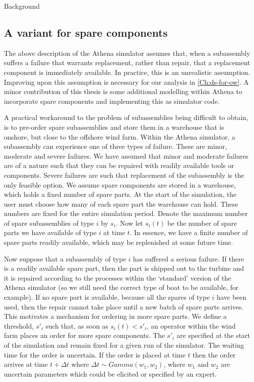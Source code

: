 \begin{chapter}{Background \label{Ch:background}}
\subsection{A variant for spare components \label{Sec:athena-variant}}

The above description of the Athena simulator assumes that, when a subassembly suffers a failure that warrants replacement, rather than repair, that a replacement component is immediately available. In practice, this is an unrealistic assumption. Improving upon this assumption is necessary for our analysis in \cref{Ch:ds-for-ow}. A minor contribution of this thesis is some additional modelling within Athena to incorporate spare components and implementing this as simulator code.

A practical workaround to the problem of subassemblies being difficult to obtain, is to pre-order spare subassemblies and store them in a warehouse that is onshore, but close to the offshore wind farm. Within the Athena simulator, a subassembly can experience one of three types of failure. These are minor, moderate and severe failures. We have assumed that minor and moderate failures are of a nature such that they can be repaired with readily available tools or components. Severe failures are such that replacement of the subassembly is the only feasible option. We assume spare components are stored in a warehouse, which holds a fixed number of spare parts. At the start of the simulation, the user must choose how many of each spare part the warehouse can hold. These numbers are fixed for the entire simulation period. Denote the maximum number of spare subassemblies of type $i$ by $s_i$. Now let $s_i(t)$ be the number of spare parts we have available of type $i$ at time $t$. In essence, we have a finite number of spare parts readily available, which may be replenished at some future time.

Now suppose that a subassembly of type $i$ has suffered a serious failure. If there is a readily available spare part, then the part is shipped out to the turbine and it is repaired according to the processes within the `standard' version of the Athena simulator (so we still need the correct type of boat to be available, for example). If no spare part is available, because all the spares of type $i$ have been used, then the repair cannot take place until a new batch of spare parts arrives. This motivates a mechanism for ordering in more spare parts. We define a threshold, $s'_i$ such that, as soon as $s_i(t) < s'_i$, an operator within the wind farm places an order for more spare components. The $s'_i$ are specified at the start of the simulation and remain fixed for a given run of the simulator. The waiting time for the order is uncertain. If the order is placed at time $t$ then the order arrives at time $t + \Delta t$ where $\Delta t \sim Gamma(w_1, w_2)$, where $w_1$ and $w_2$ are uncertain parameters which could be elicited or specified by an expert.


\end{chapter}
